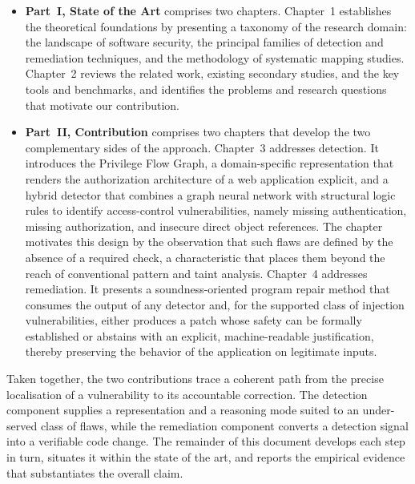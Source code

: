 \begin{itemize}[leftmargin=*]
\item \textbf{Part~I, State of the Art} comprises two chapters. Chapter~1 establishes the theoretical foundations by presenting a taxonomy of the research domain: the landscape of software security, the principal families of detection and remediation techniques, and the methodology of systematic mapping studies. Chapter~2 reviews the related work, existing secondary studies, and the key tools and benchmarks, and identifies the problems and research questions that motivate our contribution.

\item \textbf{Part~II, Contribution} comprises two chapters that develop the two complementary sides of the approach. Chapter~3 addresses detection. It introduces the Privilege Flow Graph, a domain-specific representation that renders the authorization architecture of a web application explicit, and a hybrid detector that combines a graph neural network with structural logic rules to identify access-control vulnerabilities, namely missing authentication, missing authorization, and insecure direct object references. The chapter motivates this design by the observation that such flaws are defined by the absence of a required check, a characteristic that places them beyond the reach of conventional pattern and taint analysis. Chapter~4 addresses remediation. It presents a soundness-oriented program repair method that consumes the output of any detector and, for the supported class of injection vulnerabilities, either produces a patch whose safety can be formally established or abstains with an explicit, machine-readable justification, thereby preserving the behavior of the application on legitimate inputs.
\end{itemize}

Taken together, the two contributions trace a coherent path from the precise localisation of a vulnerability to its accountable correction. The detection component supplies a representation and a reasoning mode suited to an under-served class of flaws, while the remediation component converts a detection signal into a verifiable code change. The remainder of this document develops each step in turn, situates it within the state of the art, and reports the empirical evidence that substantiates the overall claim.
